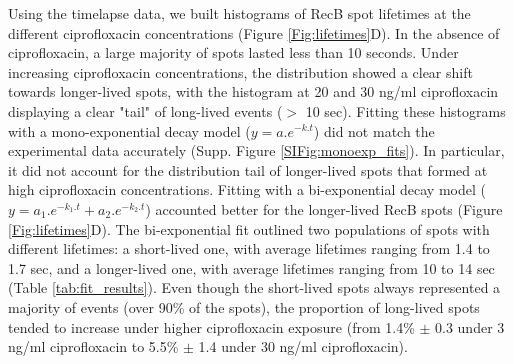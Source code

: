 Using the timelapse data, we built histograms of RecB spot lifetimes at the different ciprofloxacin concentrations (Figure \ref{Fig:lifetimes}D). In the absence of ciprofloxacin, a large majority of spots lasted less than 10 seconds. Under increasing ciprofloxacin concentrations, the distribution showed a clear shift towards longer-lived spots, with the histogram at 20 and 30 ng/ml ciprofloxacin displaying a clear "tail" of long-lived events ($>$ 10 sec). Fitting these histograms with a mono-exponential decay model ($y = a.e^{-k.t}$) did not match the experimental data accurately (Supp. Figure \ref{SIFig:monoexp_fits}). In particular, it did not account for the distribution tail of longer-lived spots that formed at high ciprofloxacin concentrations. Fitting with a bi-exponential decay model ($y = a_1.e^{-k_1.t} + a_2.e^{-k_2.t}$) accounted better for the longer-lived RecB spots (Figure \ref{Fig:lifetimes}D). The bi-exponential fit outlined two populations of spots with different lifetimes: a short-lived one, with average lifetimes ranging from 1.4 to 1.7 sec, and a longer-lived one, with average lifetimes ranging from 10 to 14 sec (Table \ref{tab:fit_results}). Even though the short-lived spots always represented a majority of events (over 90\% of the spots), the proportion of long-lived spots tended to increase under higher ciprofloxacin exposure (from 1.4\% $\pm$ 0.3 under 3 ng/ml ciprofloxacin to 5.5\% $\pm$ 1.4 under 30 ng/ml ciprofloxacin).

